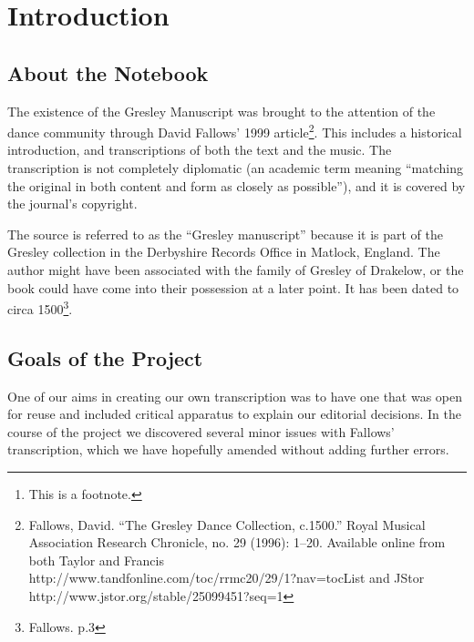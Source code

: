 \documentclass[12pt,letter]{article} %
\begin{document}
    \title{\rmfamily\normalfont{}}
    \author{}
    \date{} %
    
    \maketitle
    
    \begin{abstract}
        \noindent\lipsum[1] Just a test.\footnote{This is a footnote.}
    \end{abstract}
    \tableofcontents
\newpage
\section{Introduction}
\subsection{About the Notebook}
The existence of the Gresley Manuscript was brought to the attention of the dance community through David Fallows’ 1999 article\footnote{Fallows, David. “The Gresley Dance Collection, c.1500.” Royal Musical Association Research Chronicle, no. 29 (1996): 1–20. Available online from both Taylor and Francis\\  http://www.tandfonline.com/toc/rrmc20/29/1?nav=tocList and JStor http://www.jstor.org/stable/25099451?seq=1}.  This includes a historical introduction, and transcriptions of both the text and the music.  The transcription is not completely diplomatic (an academic term meaning “matching the original in both content and form as closely as possible”), and it is covered by the journal’s copyright.

The source is referred to as the “Gresley manuscript” because it is part of the Gresley collection in the Derbyshire Records Office in Matlock, England. The author might have been associated with the family of Gresley of Drakelow, or the book could have come into their possession at a later point.  It has been dated to circa 1500\footnote{Fallows. p.3}.
\subsection{Goals of the Project}
One of our aims in creating our own transcription was to have one that was open for reuse and included critical apparatus to explain our editorial decisions.  In the course of the project we discovered several minor issues with Fallows’ transcription, which we have hopefully amended without adding further errors.
\end{document}
